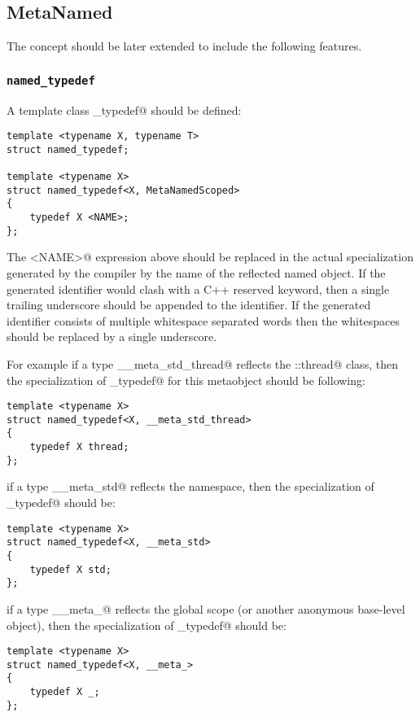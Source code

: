 \subsection{MetaNamed}

The  concept should be later extended
to include the following features.

\subsubsection{\texttt{named\_typedef}}

A template class \verb@named_typedef@ should be defined:

\begin{verbatim}
template <typename X, typename T>
struct named_typedef;

template <typename X>
struct named_typedef<X, MetaNamedScoped>
{
	typedef X <NAME>;
};
\end{verbatim}

The \verb@<NAME>@ expression above should be replaced in the actual specialization generated by the compiler
by the name of the reflected named object. If the generated identifier would clash with a C++
reserved keyword, then a single trailing underscore should be appended to the identifier.
If the generated identifier consists of multiple whitespace separated words then the whitespaces
should be replaced by a single underscore.

For example if a type \verb@__meta_std_thread@
reflects the \verb@std::thread@ class, then the specialization of \verb@named_typedef@
for this metaobject should be following:

\begin{verbatim}
template <typename X>
struct named_typedef<X, __meta_std_thread>
{
	typedef X thread;
};
\end{verbatim}

if a type \verb@__meta_std@ reflects the \verb@std@ namespace, then the specialization of \verb@named_typedef@
should be:

\begin{verbatim}
template <typename X>
struct named_typedef<X, __meta_std>
{
	typedef X std;
};
\end{verbatim}

if a type \verb@__meta_@ reflects the global scope (or another anonymous base-level object),
then the specialization of \verb@named_typedef@ should be:

\begin{verbatim}
template <typename X>
struct named_typedef<X, __meta_>
{
	typedef X _;
};
\end{verbatim}


